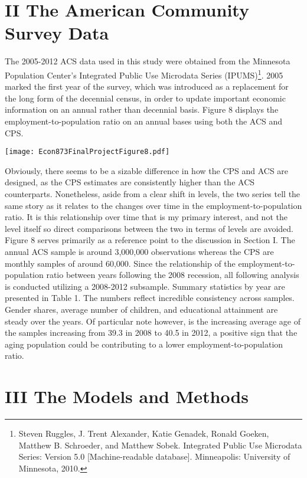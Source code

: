 \documentclass[11pt]{article}
\theoremstyle{definition}
\begin{document}
\section*{II The American Community Survey Data}
\indent
\par
The 2005-2012 ACS data used in this study were obtained from the Minnesota Population Center's Integrated Public Use Microdata Series (IPUMS)\footnote{Steven Ruggles, J. Trent Alexander, Katie Genadek, Ronald Goeken, Matthew B. Schroeder, and Matthew Sobek. Integrated Public Use Microdata Series: Version 5.0 [Machine-readable database]. Minneapolis: University of Minnesota, 2010.}.  2005 marked the first year of the survey, which was introduced as a replacement for the long form of the decennial census, in order to update important economic information on an annual rather than decennial basis.  Figure 8 displays the employment-to-population ratio on an annual bases using both the ACS and CPS.  

\begin{center}
\texttt{[image: Econ873FinalProjectFigure8.pdf]}
\end{center}

Obviously, there seems to be a sizable difference in how the CPS and ACS are designed, as the CPS estimates are consistently higher than the ACS counterparts.  Nonetheless, aside from a clear shift in levels, the two series tell the same story as it relates to the changes over time in the employment-to-population ratio.  It is this relationship over time that is my primary interest, and not the level itself so direct comparisons between the two in terms of levels are avoided.  Figure 8 serves primarily as a reference point to the discussion in Section I.  The annual ACS sample is around 3,000,000 observations whereas the CPS are monthly samples of around 60,000.  Since the relationship of the employment-to-population ratio between years following the 2008 recession, all following analysis is conducted utilizing a 2008-2012 subsample.  Summary statistics by year are presented in Table 1. The numbers reflect incredible consistency across samples.  Gender shares, average number of children, and educational attainment are steady over the years.  Of particular note however, is the increasing average age of the samples increasing from 39.3 in 2008 to 40.5 in 2012, a positive sign that the aging population could be contributing to a lower employment-to-population ratio.  

\section*{III The Models and Methods}
\indent
\par
\end{document}
